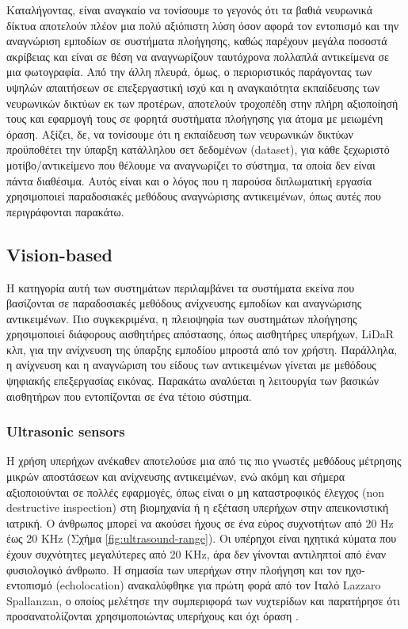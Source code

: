 Καταλήγοντας, είναι αναγκαίο να τονίσουμε το γεγονός ότι τα βαθιά νευρωνικά δίκτυα αποτελούν πλέον μια πολύ αξιόπιστη λύση όσον αφορά τον εντοπισμό και την αναγνώριση εμποδίων σε συστήματα πλοήγησης, καθώς παρέχουν μεγάλα ποσοστά ακρίβειας και είναι σε θέση να αναγνωρίζουν ταυτόχρονα πολλαπλά αντικείμενα σε μια φωτογραφία. Από την άλλη πλευρά, όμως, ο περιοριστικός παράγοντας των υψηλών απαιτήσεων σε επεξεργαστική ισχύ και η αναγκαιότητα εκπαίδευσης των νευρωνικών δικτύων εκ των προτέρων, αποτελούν τροχοπέδη στην πλήρη αξιοποίησή τους και εφαρμογή τους σε φορητά συστήματα πλοήγησης για άτομα με μειωμένη όραση. Αξίζει, δε, να τονίσουμε ότι η εκπαίδευση των νευρωνικών δικτύων προϋποθέτει την ύπαρξη κατάλληλου σετ δεδομένων (dataset), για κάθε ξεχωριστό μοτίβο/αντικείμενο που θέλουμε να αναγνωρίζει το σύστημα, τα οποία δεν είναι πάντα διαθέσιμα. Αυτός είναι και ο λόγος που η παρούσα διπλωματική εργασία χρησιμοποιεί παραδοσιακές μεθόδους αναγνώρισης αντικειμένων, όπως αυτές που περιγράφονται παρακάτω.

\subsection{Vision-based}
Η κατηγορία αυτή των συστημάτων περιλαμβάνει τα συστήματα εκείνα που βασίζονται σε παραδοσιακές μεθόδους ανίχνευσης εμποδίων και αναγνώρισης αντικειμένων. Πιο συγκεκριμένα, η πλειοψηφία των συστημάτων πλοήγησης χρησιμοποιεί διάφορους αισθητήρες απόστασης, όπως αισθητήρες υπερήχων, LiDaR κλπ, για την ανίχνευση της ύπαρξης εμποδίου μπροστά από τον χρήστη. Παράλληλα, η ανίχνευση και η αναγνώριση του είδους των αντικειμένων γίνεται με μεθόδους ψηφιακής επεξεργασίας εικόνας. Παρακάτω αναλύεται η λειτουργία των βασικών αισθητήρων που εντοπίζονται σε ένα τέτοιο σύστημα.

\subsubsection{Ultrasonic sensors}
Η χρήση υπερήχων ανέκαθεν αποτελούσε μια από τις πιο γνωστές μεθόδους μέτρησης μικρών αποστάσεων και ανίχνευσης αντικειμένων, ενώ ακόμη και σήμερα αξιοποιούνται σε πολλές εφαρμογές, όπως είναι ο μη καταστροφικός έλεγχος (non destructive inspection) στη βιομηχανία ή η εξέταση υπερήχων στην απεικονιστική ιατρική. Ο άνθρωπος μπορεί να ακούσει ήχους σε ένα εύρος συχνοτήτων από 20 Hz έως 20 KHz (Σχήμα \ref{fig:ultrasound-range}). Οι υπέρηχοι είναι ηχητικά κύματα που έχουν συχνότητες μεγαλύτερες από 20 KHz, άρα δεν γίνονται αντιληπτοί από έναν φυσιολογικό άνθρωπο. Η σημασία των υπερήχων στην πλοήγηση και τον ηχο-εντοπισμό (echolocation) ανακαλύφθηκε για πρώτη φορά από τον Ιταλό Lazzaro Spallanzan, ο οποίος μελέτησε την συμπεριφορά των νυχτερίδων και παρατήρησε ότι προσανατολίζονται χρησιμοποιώντας υπερήχους και όχι όραση \cite{spallanzani1794lettere}. 

